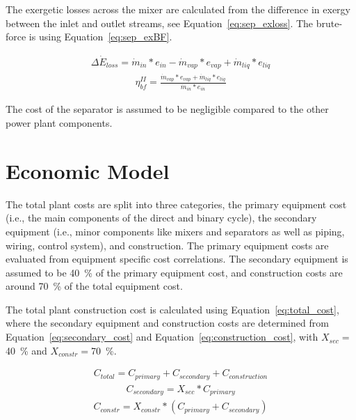         The exergetic losses across the mixer are calculated from the difference in exergy between the inlet and outlet streams, see Equation~\ref{eq:sep_exloss}. The brute-force is using Equation~\ref{eq:sep_exBF}.
        
        \begin{align}
            \Delta\Dot{E}_{loss} = \Dot{m}_{in}*e_{in} - \Dot{m}_{vap}*e_{vap} + \Dot{m}_{liq}*e_{liq}\label{eq:sep_exloss}
        \end{align}
        \begin{align}
            \eta_{bf}^{II}= \frac{\Dot{m}_{vap}*e_{vap} + \Dot{m}_{liq}*e_{liq}}{\Dot{m}_{in}*e_{in}} \label{eq:sep_exBF}
        \end{align}

        The cost of the separator is assumed to be negligible compared to the other power plant components.

\section{Economic Model}
    \label{sec:prosim_Power_Cycle_economic_model}
    The total plant costs are split into three categories, the primary equipment cost (i.e., the main components of the direct and binary cycle), the secondary equipment (i.e., minor components like mixers and separators as well as piping, wiring, control system), and construction. The primary equipment costs are evaluated from equipment specific cost correlations. The secondary equipment is assumed to be \qty{40}{\percent} of the primary equipment cost, and construction costs are around \qty{70}{\percent} of the total equipment cost\cite{Astolfi2014B}. 
    
    The total plant construction cost is calculated using Equation~\ref{eq:total_cost}, where the secondary equipment and construction costs are determined from Equation~\ref{eq:secondary_cost} and Equation~\ref{eq:construction_cost}, with \(X_{sec}=\)\qty{40}{\percent} and \( X_{constr}=\)\qty{70}{\percent}.

    \begin{align}
        C_{total} = C_{primary} + C_{secondary} + C_{construction} \label{eq:total_cost}
    \end{align}
    \begin{align}
        C_{secondary} = X_{sec}*C_{primary} \label{eq:secondary_cost}
    \end{align}
    \begin{align}
        C_{constr} = X_{constr}*(C_{primary} + C_{secondary}) \label{eq:construction_cost}
    \end{align}

